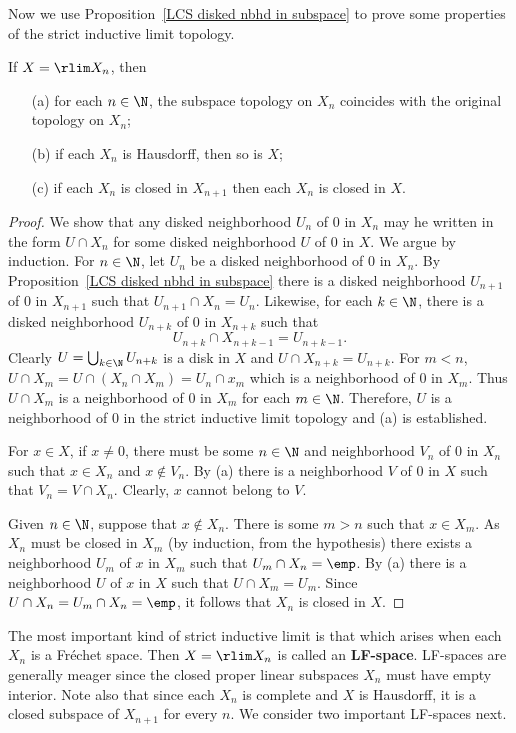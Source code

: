 Now we use Proposition~\ref{LCS disked nbhd in subspace} to prove some properties of the strict inductive limit topology.
\begin{proposition}\label{LCS str inductive limit topo}
If $X=\rlim X_n$, then
\begin{itemize}
\item[(a)] for each $n\in\N$, the subspace topology on $X_n$ coincides with the original topology on $X_n$;
\item[(b)] if each $X_n$ is Hausdorff, then so is $X$;
\item[(c)] if each $X_n$ is closed in $X_{n+1}$ then each $X_n$ is closed in $X$.
\end{itemize}
\end{proposition}
\begin{proof}
We show that any disked neighborhood $U_n$ of $0$ in $X_n$ may he written in the form $U\cap X_n$ for some disked neighborhood $U$ of $0$ in $X$. We argue by induction. For $n\in\N$, let $U_n$ be a disked neighborhood of $0$ in $X_n$. By Proposition~\ref{LCS disked nbhd in subspace} there is a disked neighborhood $U_{n+1}$ of $0$ in $X_{n+1}$ such that $U_{n+1}\cap X_n=U_n$. Likewise, for each $k\in\N$, there is a disked neighborhood $U_{n+k}$ of $0$ in $X_{n+k}$ such that
\[U_{n+k}\cap X_{n+k-1}=U_{n+k-1}.\]
Clearly $U=\bigcup_{k\in\N}U_{n+k}$ is a disk in $X$ and $U\cap X_{n+k}=U_{n+k}$. For $m<n$, $U\cap X_m=U\cap(X_n\cap X_m)=U_n\cap x_m$ which is a neighborhood of $0$ in $X_m$. Thus $U\cap X_m$ is a neighborhood of $0$ in $X_m$ for each $m\in\N$. Therefore, $U$ is a neighborhood of $0$ in the strict inductive limit topology and (a) is established.\par
For $x\in X$, if $x\neq 0$, there must be some $n\in\N$ and neighborhood $V_n$ of $0$ in $X_n$ such that $x\in X_n$ and $x\notin V_n$. By (a) there is a neighborhood $V$ of $0$ in $X$ such that $V_n=V\cap X_n$. Clearly, $x$ cannot belong to $V$.\par
Given $n\in\N$, suppose that $x\notin X_n$. There is some $m>n$ such that $x\in X_m$. As $X_n$ must be closed in $X_m$ (by induction, from the hypothesis) there exists a neighborhood $U_m$ of $x$ in $X_m$ such that $U_m\cap X_n=\emp$. By (a) there is a neighborhood $U$ of $x$ in $X$ such that $U\cap X_m=U_m$. Since $U\cap X_n=U_m\cap X_n=\emp$, it follows that $X_n$ is closed in $X$.
\end{proof}
The most important kind of strict inductive limit is that which arises when each $X_n$ is a Fr\'echet space. Then $X=\rlim X_n$ is called an \textbf{LF-space}. LF-spaces are generally meager since the closed proper linear subspaces $X_n$ must have empty interior. Note also that since each $X_n$ is complete and $X$ is Hausdorff, it is a closed subspace of $X_{n+1}$ for every $n$. We consider two important LF-spaces next.
